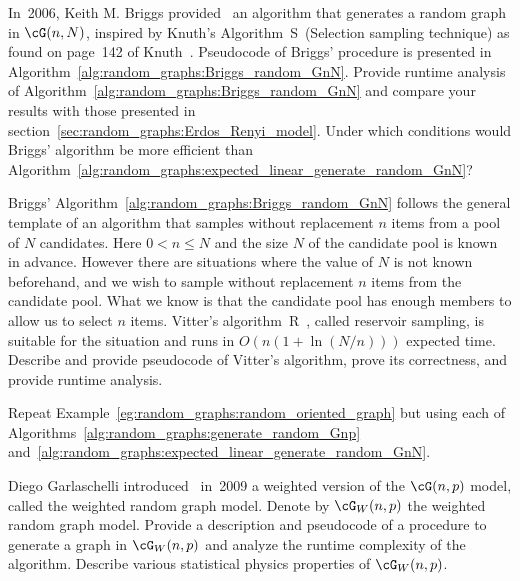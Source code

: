 \begin{problem}
\item In~2006, Keith M. Briggs
  provided~\cite{Briggs2011} an algorithm that generates a random
  graph in $\cG(n,N)$, inspired by Knuth's
  Algorithm~S~(Selection sampling technique) as found on page~142 of
  Knuth~\cite{Knuth1998b}. Pseudocode of
  Briggs' procedure is presented in
  Algorithm~\ref{alg:random_graphs:Briggs_random_GnN}. Provide runtime
  analysis of Algorithm~\ref{alg:random_graphs:Briggs_random_GnN} and
  compare your results with those presented in
  section~\ref{sec:random_graphs:Erdos_Renyi_model}. Under which
  conditions would Briggs' algorithm be more efficient than
  Algorithm~\ref{alg:random_graphs:expected_linear_generate_random_GnN}?

\item Briggs'
  Algorithm~\ref{alg:random_graphs:Briggs_random_GnN} follows the
  general template of an algorithm that samples without replacement
  $n$ items from a pool of $N$ candidates. Here $0 < n \leq N$ and the
  size $N$ of the candidate pool is known in advance. However there
  are situations where the value of $N$ is not known beforehand, and
  we wish to sample without replacement $n$ items from the candidate
  pool. What we know is that the candidate pool has enough members to
  allow us to select $n$ items. Vitter's
  algorithm~R~\cite{Vitter1985}, called
  reservoir sampling, is suitable for the
  situation and runs in $O(n (1 + \ln(N/n)))$ expected time. Describe
  and provide pseudocode of Vitter's algorithm,
  prove its correctness, and provide runtime analysis.

\item Repeat Example~\ref{eg:random_graphs:random_oriented_graph} but
  using each of Algorithms~\ref{alg:random_graphs:generate_random_Gnp}
  and~\ref{alg:random_graphs:expected_linear_generate_random_GnN}.

\item Diego Garlaschelli
  introduced~\cite{Garlaschelli2009} in~2009 a weighted version of the
  $\cG(n,p)$ model, called the weighted
  random graph model. Denote by $\cG_W(n,p)$ the weighted random graph
  model. Provide a description and pseudocode of a procedure to
  generate a graph in $\cG_W(n,p)$ and analyze the runtime complexity
  of the algorithm. Describe various statistical physics properties of
  $\cG_W(n,p)$.


\end{problem}

